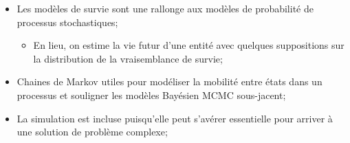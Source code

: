 \begin{distributions}[Description]
\begin{itemize}
\begin{itemize}
		\end{itemize}
	\item	Les modèles de survie sont une rallonge aux modèles de probabilité de processus stochastiques;
		\begin{itemize}
		\item	En lieu, on estime la vie futur d'une entité avec quelques suppositions sur la distribution de la vraisemblance de survie;
		\end{itemize}
	\item	Chaines de Markov utiles pour modéliser la mobilité entre états dans un processus et souligner les modèles Bayésien MCMC sous-jacent;
	\item	La simulation est incluse puisqu'elle peut s'avérer essentielle pour arriver à une solution de problème complexe;
\end{itemize}
\end{distributions}


